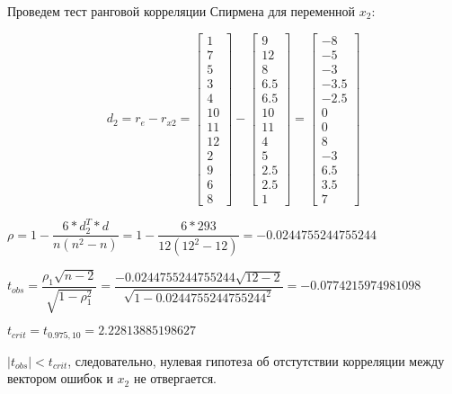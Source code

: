 \documentclass[12pt,a4paper, oneside]{extreport}
\begin{document}
Проведем тест ранговой корреляции Спирмена для переменной $x_2$:

\begin{equation}\label{key}
d_2 = r_e-r_{x2}  =  \begin{bmatrix} 
1 \\ 7 \\ 5 \\ 3 \\ 4 \\ 10 \\ 11 \\ 12 \\ 2 \\ 9 \\ 6 \\ 8\end{bmatrix} -  \begin{bmatrix} 
9 \\ 12 \\ 8 \\ 6.5 \\ 6.5 \\ 10 \\ 11 \\ 4 \\ 5 \\ 2.5 \\ 2.5 \\ 1\end{bmatrix} =   \begin{bmatrix} 
-8 \\ -5 \\ -3 \\ -3.5 \\ -2.5 \\ 0 \\ 0 \\ 8 \\ -3 \\ 6.5 \\ 3.5 \\ 7\end{bmatrix}
\end{equation}

$\rho = 1 -\dfrac{6*d^T_2*d}{n(n^2-n)} = 1 -\dfrac{6*293}{12(12^2-12)} = -0.0244755244755244 $

$t_{obs} = \dfrac{\rho_1 \sqrt{n-2} }{\sqrt{1-\rho^2_1} } = \dfrac{-0.0244755244755244 \sqrt{12-2} }{\sqrt{1-0.0244755244755244^2} } = -0.0774215974981098 $

$t_{crit}  = t_{0.975, 10} = 2.22813885198627$

$|t_{obs}| < t_{crit} $, следовательно, нулевая гипотеза об отстутствии корреляции между вектором ошибок и $x_2$ не отвергается.   
\end{document}
